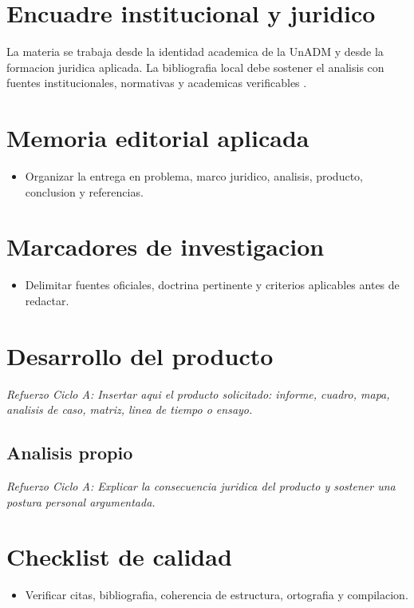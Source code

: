 \documentclass[12pt,letterpaper,oneside]{article}
\begin{document}
\section{Encuadre institucional y juridico}
La materia se trabaja desde la identidad academica de la UnADM y desde la
formacion juridica aplicada. La bibliografia local debe sostener el analisis
con fuentes institucionales, normativas y academicas verificables \citep{unadmSitioWeb,unadmMallaDerecho2024}.

\section{Memoria editorial aplicada}
\begin{itemize}
  \item Organizar la entrega en problema, marco juridico, analisis, producto, conclusion y referencias.
\end{itemize}

\section{Marcadores de investigacion}
\begin{itemize}
  \item Delimitar fuentes oficiales, doctrina pertinente y criterios aplicables antes de redactar.
\end{itemize}

\section{Desarrollo del producto}
\textit{Refuerzo Ciclo A: Insertar aqui el producto solicitado: informe, cuadro, mapa, analisis de caso, matriz, linea de tiempo o ensayo.}

\subsection{Analisis propio}
\textit{Refuerzo Ciclo A: Explicar la consecuencia juridica del producto y sostener una postura personal argumentada.}

\section{Checklist de calidad}
\begin{itemize}
  \item Verificar citas, bibliografia, coherencia de estructura, ortografia y compilacion.
\end{itemize}
\end{document}
